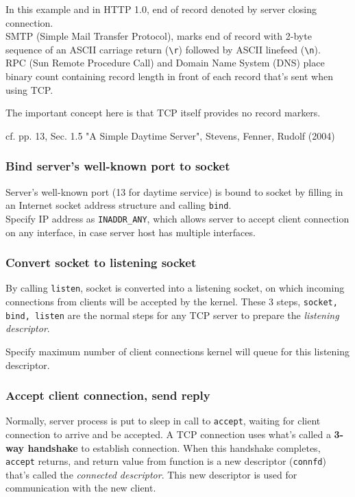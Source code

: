 \documentclass[10pt]{amsart}
\begin{document}
\begin{multicols*}{2}
In this example and in HTTP 1.0, end of record denoted by server closing connection. \\
SMTP (Simple Mail Transfer Protocol), marks end of record with 2-byte sequence of an ASCII carriage return (\verb|\r|) followed by ASCII linefeed (\verb|\n|). \\
RPC (Sun Remote Procedure Call) and Domain Name System (DNS) place binary count containing record length in front of each record that's sent when using TCP.

The important concept here is that TCP itself provides no record markers.

cf. pp. 13, Sec. 1.5 "A Simple Daytime Server", Stevens, Fenner, Rudolf (2004) \cite{SFR2004}

\subsubsection{Bind server's well-known port to socket}

Server's well-known port (13 for daytime service) is bound to socket by filling in an Internet socket address structure and calling \verb|bind|. \\
Specify IP address as \verb|INADDR_ANY|, which allows server to accept client connection on any interface, in case server host has multiple interfaces.

\subsubsection{Convert socket to listening socket}

By calling \verb|listen|, socket is converted into a listening socket, on which incoming connections from clients will be accepted by the kernel. These 3 steps, \verb|socket, bind, listen| are the normal steps for any TCP server to prepare the \emph{listening descriptor}.

Specify maximum number of client connections kernel will queue for this listening descriptor.

\subsubsection{Accept client connection, send reply}

Normally, server process is put to sleep in call to \verb|accept|, waiting for client connection to arrive and be accepted. A TCP connection uses what's called a \textbf{3-way handshake} to establish connection. When this handshake completes, \verb|accept| returns, and return value from function is a new descriptor (\verb|connfd|) that's called the \emph{connected descriptor}. This new descriptor is used for communication with the new client.


\end{multicols*}
\end{document}
